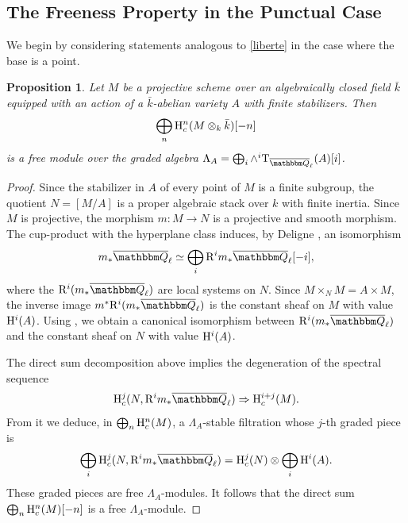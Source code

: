 \documentclass[12pt,english]{smfart}
\numberwithin{equation}{subsection}
\newtheorem{proposition}[equation]{Proposition}
\theoremstyle{remark}
\newcommand\rmT{{\rm T}}
\newcommand\QQ{{\mathbbm Q}}
\newcommand\rmH{{\rm H}}
\newcommand\rmR{{\rm R}}
\newcommand\Ql{{\overline\QQ_\ell}}
\begin{document}
\subsection{The Freeness Property in the Punctual Case}\label{subsection : liberte ponctuel}

We begin by considering statements analogous to \ref{liberte} in the case where the base is a point.

\begin{proposition}\label{liberte ponctuel}
Let $M$ be a projective scheme over an algebraically closed field $\bar k$ equipped with an action of a $\bar k$-abelian variety $A$ with finite stabilizers. Then
$$\bigoplus_n \rmH^n_c(M\otimes_k \bar k)[-n]$$
is a free module over the graded algebra $\Lambda_A=\bigoplus_i \wedge^i\rmT_\Ql(A)[i]$.
\end{proposition}

\begin{proof}
Since the stabilizer in $A$ of every point of $M$ is a finite subgroup, the quotient $N=[M/A]$ is a proper algebraic stack over $k$ with finite inertia. Since $M$ is projective, the morphism $m:M\rightarrow N$ is a projective and smooth morphism. The cup-product with the hyperplane class induces, by Deligne \cite{D-dec}, an isomorphism
$$m_*\Ql \simeq \bigoplus_i \rmR^i m_*\Ql[-i],$$
where the $\rmR^i(m_*\Ql)$ are local systems on $N$. Since $M\times_N M=A\times M$, the inverse image $m^*\rmR^i(m_*\Ql)$ is the constant sheaf on $M$ with value $\rmH^i(A)$. Using \cite[4.2.5]{BBD}, we obtain a canonical isomorphism between $\rmR^i(m_*\Ql)$ and the constant sheaf on $N$ with value $\rmH^i(A)$.

The direct sum decomposition above implies the degeneration of the spectral sequence
$$\rmH^j_c(N,\rmR^i m_*\Ql)\Rightarrow \rmH^{i+j}_c(M).$$
From it we deduce, in $\bigoplus_n \rmH^n_c(M)$, a $\Lambda_A$-stable filtration whose $j$-th graded piece is
$$\bigoplus_i \rmH^j_c(N,\rmR^i m_*\Ql)=\rmH^j_c(N)\otimes \bigoplus_i \rmH^i(A).$$
These graded pieces are free $\Lambda_A$-modules. It follows that the direct sum $\bigoplus_n \rmH^n_c(M)[-n]$ is a free $\Lambda_A$-module.
\end{proof}
\end{document}
